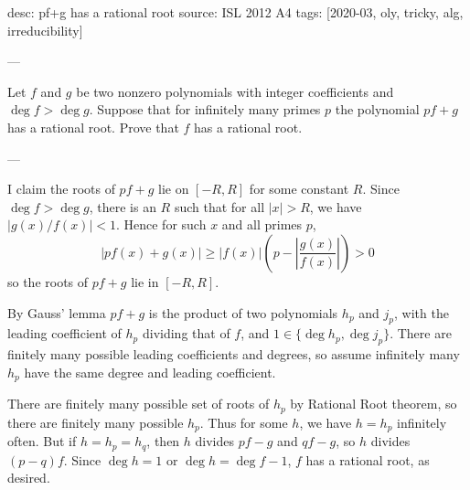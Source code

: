 desc: pf+g has a rational root
source: ISL 2012 A4
tags: [2020-03, oly, tricky, alg, irreducibility]

---

Let $f$ and $g$ be two nonzero polynomials with integer coefficients and $\deg f>\deg g$. Suppose that for infinitely many primes $p$ the polynomial $pf+g$ has a rational root. Prove that $f$ has a rational root.

---

I claim the roots of $pf+g$ lie on $[-R,R]$ for some constant $R$. Since $\deg f>\deg g$, there is an $R$ such that for all $|x|>R$, we have $|g(x)/f(x)|<1$. Hence for such $x$ and all primes $p$, \[|pf(x)+g(x)|\ge|f(x)|\left(p-\left\lvert\frac{g(x)}{f(x)}\right\rvert\right)>0\]
so the roots of $pf+g$ lie in $[-R,R]$.

By Gauss' lemma $pf+g$ is the product of two polynomials $h_p$ and $j_p$, with the leading coefficient of $h_p$ dividing that of $f$, and $1\in\{\deg h_p,\deg j_p\}$. There are finitely many possible leading coefficients and degrees, so assume infinitely many $h_p$ have the same degree and leading coefficient.

There are finitely many possible set of roots of $h_p$ by Rational Root theorem, so there are finitely many possible $h_p$. Thus for some $h$, we have $h=h_p$ infinitely often. But if $h=h_p=h_q$, then $h$ divides $pf-g$ and $qf-g$, so $h$ divides $(p-q)f$. Since $\deg h=1$ or $\deg h=\deg f-1$, $f$ has a rational root, as desired.
